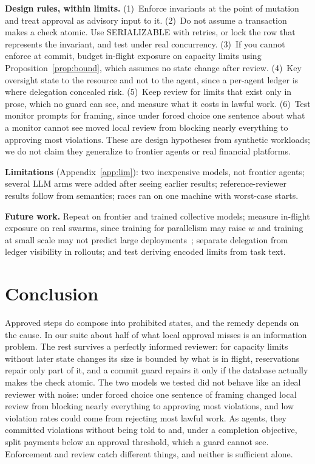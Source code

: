 \documentclass[10pt]{article}
\begin{document}
\textbf{Design rules, within limits.} (1)~Enforce invariants at the point of mutation and treat approval as advisory input to it. (2)~Do not assume a transaction makes a check atomic. Use SERIALIZABLE with retries, or lock the row that represents the invariant, and test under real concurrency. (3)~If you cannot enforce at commit, budget in-flight exposure on capacity limits using Proposition~\ref{prop:bound}, which assumes no state change after review. (4)~Key oversight state to the resource and not to the agent, since a per-agent ledger is where delegation concealed risk. (5)~Keep review for limits that exist only in prose, which no guard can see, and measure what it costs in lawful work. (6)~Test monitor prompts for framing, since under forced choice one sentence about what a monitor cannot see moved local review from blocking nearly everything to approving most violations. These are design hypotheses from synthetic workloads; we do not claim they generalize to frontier agents or real financial platforms.

\textbf{Limitations} (Appendix~\ref{app:lim}): two inexpensive models, not frontier agents; several LLM arms were added after seeing earlier results; reference-reviewer results follow from semantics; races ran on one machine with worst-case starts.

\textbf{Future work.} Repeat on frontier and trained collective models; measure in-flight exposure on real swarms, since training for parallelism may raise $w$ and training at small scale may not predict large deployments~\cite{gr2026}; separate delegation from ledger visibility in rollouts; and test deriving encoded limits from task text.

\section{Conclusion}
Approved steps do compose into prohibited states, and the remedy depends on the cause. In our suite about half of what local approval misses is an information problem. The rest survives a perfectly informed reviewer: for capacity limits without later state changes its size is bounded by what is in flight, reservations repair only part of it, and a commit guard repairs it only if the database actually makes the check atomic. The two models we tested did not behave like an ideal reviewer with noise: under forced choice one sentence of framing changed local review from blocking nearly everything to approving most violations, and low violation rates could come from rejecting most lawful work. As agents, they committed violations without being told to and, under a completion objective, split payments below an approval threshold, which a guard cannot see. Enforcement and review catch different things, and neither is sufficient alone.
\end{document}
